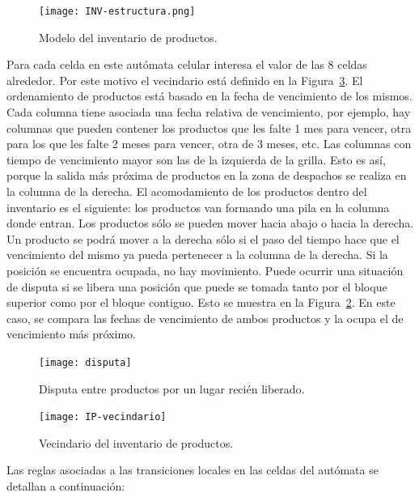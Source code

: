 \documentclass[10pt]{article}
\begin{document}
\begin{figure}[h] 
	\centering 
	\texttt{[image: INV-estructura.png]} 
	\caption{Modelo del inventario de productos.} 
	\label{fig:IP-estructura} 
\end{figure}
Para cada celda en este autómata celular interesa el valor de las $8$ celdas alrededor. Por este motivo el vecindario está definido en la Figura~\ref{fig:IP-vecindario}. El ordenamiento de productos está basado en la fecha de vencimiento de los mismos. Cada columna tiene asociada una fecha relativa de vencimiento, por ejemplo, hay columnas que pueden contener los productos que les falte 1 mes para vencer, otra para los que les falte 2 meses para vencer, otra de 3 meses, etc. Las columnas con tiempo de vencimiento mayor son las de la izquierda de la grilla. Esto es así, porque la salida más próxima de productos en la zona de despachos se realiza en la columna de la derecha.
El acomodamiento de los productos dentro del inventario es el siguiente: los productos van formando una pila en la columna donde entran. Los productos sólo se pueden mover hacia abajo o hacia la derecha. Un producto se podrá mover a la derecha sólo si el paso del tiempo hace que el vencimiento del mismo ya pueda pertenecer a la columna de la derecha. Si la posición se encuentra ocupada, no hay movimiento.
Puede ocurrir una situación de disputa si se libera una posición que puede se tomada tanto por el bloque superior como por el bloque contiguo. Esto se muestra en la Figura~\ref{fig:IP-disputa}. En este caso, se compara las fechas de vencimiento de ambos productos y la ocupa el de vencimiento más próximo.

\begin{figure}[h] 
	\centering 
	\texttt{[image: disputa]} 
	\caption{Disputa entre productos por un lugar recién liberado.} 
	\label{fig:IP-disputa} 
\end{figure}
\FloatBarrier

\begin{figure}[h] 
  \centering 
  \texttt{[image: IP-vecindario]} 
  \caption{Vecindario del inventario de productos.} 
  \label{fig:IP-vecindario} 
\end{figure}
\FloatBarrier

Las reglas asociadas a las transiciones locales en las celdas del autómata se detallan a continuación:
\end{document}
